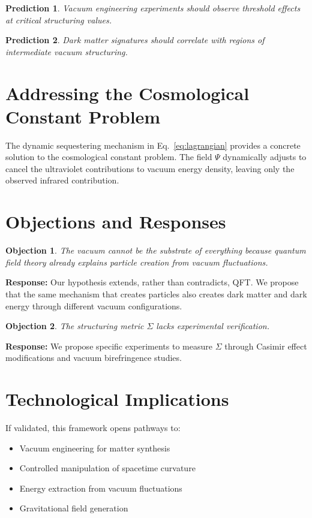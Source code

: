 \documentclass[12pt,a4paper]{article}
\newcommand{\structuring}{\Sigma}
\newtheorem{prediction}{Prediction}
\newtheorem{objection}{Objection}
\begin{document}
\begin{prediction}
Vacuum engineering experiments should observe threshold effects at critical structuring values.
\end{prediction}

\begin{prediction}
Dark matter signatures should correlate with regions of intermediate vacuum structuring.
\end{prediction}

\section{Addressing the Cosmological Constant Problem}

The dynamic sequestering mechanism in Eq.~\ref{eq:lagrangian} provides a concrete solution to the cosmological constant problem. The field $\Psi$ dynamically adjusts to cancel the ultraviolet contributions to vacuum energy density, leaving only the observed infrared contribution.

\section{Objections and Responses}

\begin{objection}
The vacuum cannot be the substrate of everything because quantum field theory already explains particle creation from vacuum fluctuations.
\end{objection}

\textbf{Response:} Our hypothesis extends, rather than contradicts, QFT. We propose that the same mechanism that creates particles also creates dark matter and dark energy through different vacuum configurations.

\begin{objection}
The structuring metric $\structuring$ lacks experimental verification.
\end{objection}

\textbf{Response:} We propose specific experiments to measure $\structuring$ through Casimir effect modifications and vacuum birefringence studies.

\section{Technological Implications}

If validated, this framework opens pathways to:
\begin{itemize}
\item Vacuum engineering for matter synthesis
\item Controlled manipulation of spacetime curvature
\item Energy extraction from vacuum fluctuations
\item Gravitational field generation
\end{itemize}
\end{document}
